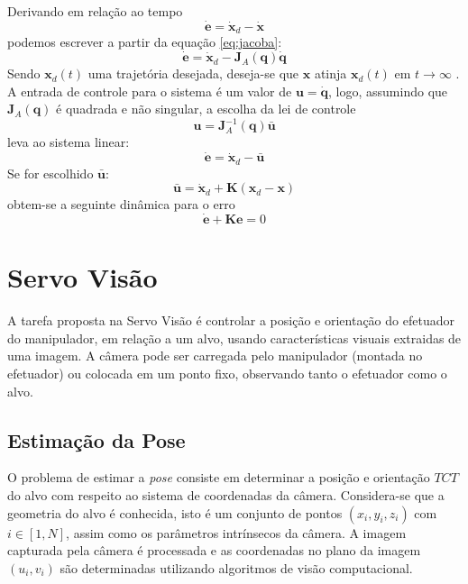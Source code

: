 Derivando em relação ao tempo
\begin{equation}
\bm{\dot{e}} = \bm{\dot{x}}_d - \bm{\dot{x}}
\end{equation}
podemos escrever a partir da equação \ref{eq:jacoba}:
\begin{equation}
\bm{\dot{e}} = \bm{\dot{x}}_d - \bm{J}_A(\bm{q})\dot{\bm{q}}
\end{equation}
Sendo $\bm{x}_d(t)$ uma trajetória desejada, deseja-se que $\bm{x}$ atinja $\bm{x}_d(t)$ em $t \to \infty$ .
A entrada de controle para o sistema é um valor de $\bm{u} = \dot{\bm{q}}$, logo, assumindo que $\bm{J}_A(\bm{q})$ é quadrada e não singular, a escolha da lei de controle
\begin{equation}
\bm{u} = \bm{J}_A^{-1}(\bm{q})\bar{\bm{u}}
\end{equation}
leva ao sistema linear:
\begin{equation}
\dot{\bm{e}} = \dot{\bm{x}}_d - \bar{\bm{u}}
\end{equation}
Se for escolhido $\bar{\bm{u}}$:
\begin{equation}
\bar{\bm{u}} = \dot{\bm{x}}_d + \bm{K} (\bm{x}_d - \bm{x})
\end{equation}
obtem-se a seguinte dinâmica para o erro
\begin{equation}
\dot{\bm{e}} + \bm{K} \bm{e} = 0
\end{equation}

\section{Servo Visão}
A tarefa proposta na Servo Visão é controlar a posição e orientação do efetuador do manipulador, em relação a um alvo, usando características visuais extraidas de uma imagem. A câmera pode ser carregada pelo manipulador (montada no efetuador) ou colocada em um ponto fixo, observando tanto o efetuador como o alvo.

\subsection{Estimação da Pose}
O problema de estimar a \textit{pose} consiste em determinar a posição e orientação $T{CT}$ do alvo com respeito ao sistema de coordenadas da câmera. Considera-se que a geometria do alvo é conhecida, isto é um conjunto de pontos $(x_i, y_i, z_i)$ com $i \in [1, N]$, assim como os parâmetros intrínsecos da câmera. A imagem capturada pela câmera é processada e as coordenadas no plano da imagem $(u_i, v_i)$ são determinadas utilizando algoritmos de visão computacional.



